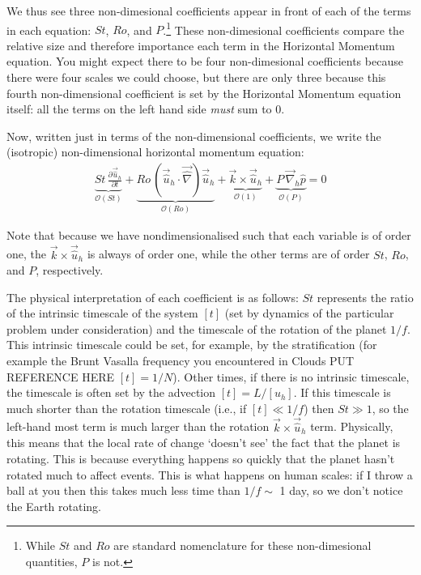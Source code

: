 We thus see three non-dimesional coefficients appear in front of each of the terms in each equation: \(St\), \(Ro\), and \(P\).\footnote{
    While \(St\) and \(Ro\) are standard nomenclature for these non-dimesional quantities, \(P\) is not.
} These non-dimesional coefficients compare the relative size and therefore importance each term in the Horizontal Momentum equation. You might expect there to be four non-dimesional coefficients because there were four scales we could choose, but there are only three because this fourth non-dimensional coefficient is set by the Horizontal Momentum equation itself: all the terms on the left hand side \textit{must} sum to \(0\).

Now, written just in terms of the non-dimensional coefficients, we write the (isotropic) non-dimensional horizontal momentum equation:
\begin{align}
    \label{Horizontal Approximate nondim}
    \underbrace{St\,\frac{\partial\vec{\hat{u}}_h}{\partial t}}_{\mathcal{O}(St)}+
    \underbrace{Ro\,\left( \vec{\hat{u}}_h\cdot\vec{\hat{\nabla}} \right)\vec{\hat{u}}_h}_{\mathcal{O}(Ro)}+
    \underbrace{\vec{k}\times\vec{\hat{u}}_h}_{\mathcal{O}(1)}+
    \underbrace{P\,\vec{\nabla}_h\hat{p}}_{\mathcal{O}(P)}=0
\end{align}

Note that because we have nondimensionalised such that each variable is of order one, the \(\vec{k}\times\vec{\hat{u}}_h\) is always of order one, while the other terms are of order \(St\), \(Ro\), and \(P\), respectively.

The physical interpretation of each coefficient is as follows: \(St\) represents the ratio of the intrinsic timescale of the system \([t]\) (set by dynamics of the particular problem under consideration) and the timescale of the rotation of the planet \(1/f\). This intrinsic timescale could be set, for example, by the stratification (for example the Brunt Vasalla frequency you encountered in Clouds PUT REFERENCE HERE \([t]=1/N\)). Other times, if there is no intrinsic timescale, the timescale is often set by the advection \([t]=L/[u_h]\). If this timescale is much shorter than the rotation timescale (i.e., if \([t]\ll 1/f\)) then \(St\gg 1\), so the left-hand most term is much larger than the rotation \(\vec{k}\times\vec{\hat{u}}_h\) term. Physically, this means that the local rate of change `doesn't see' the fact that the planet is rotating. This is because everything happens so quickly that the planet hasn't rotated much to affect events. This is what happens on human scales: if I throw a ball at you then this takes much less time than \(1/f\sim\) 1 day, so we don't notice the Earth rotating.

